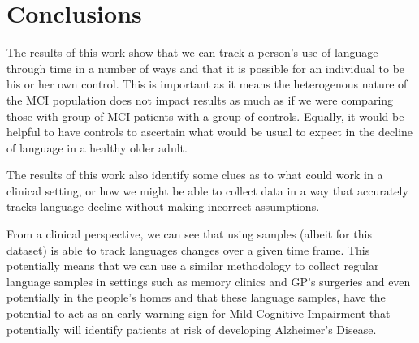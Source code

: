 \documentclass[12pt]{article}
\begin{document}
\section{Conclusions}\label{conclusions}
The results of this work show that we can track a person's use of language through time in a number of ways and that it is possible for an individual to be his or her own control. This is important as it means the heterogenous nature of the MCI population does not impact results as much as if we were comparing those with group of MCI patients with a group of controls. Equally, it would be helpful to have controls to ascertain what would be usual to expect in the decline of language in a healthy older adult. 
\par 
The results of this work also identify some clues as to what could work in a clinical setting, or how we might be able to collect data in a way that accurately tracks language decline without making incorrect assumptions. 
\par
From a clinical perspective, we can see that using samples (albeit for this dataset) is able to track languages changes over a given time frame. This potentially means that we can use a similar methodology to collect regular language samples in settings such as memory clinics and GP's surgeries and even potentially in the people's homes and that these language samples, have the potential to act as an early warning sign for Mild Cognitive Impairment that potentially will identify patients at risk of developing Alzheimer's Disease.


\end{document}
